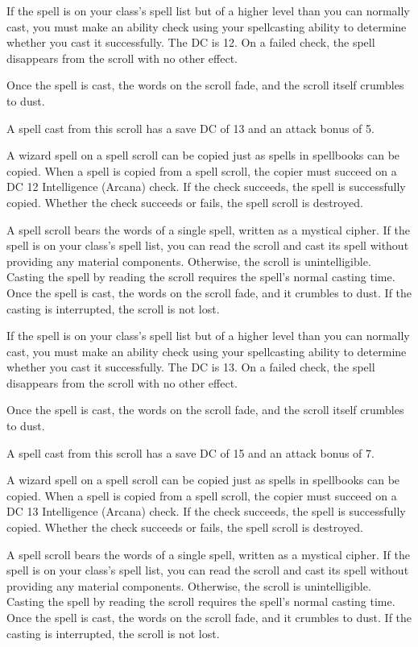 \documentclass[10pt,a4paper,twoside,bg=print,twocolumn,openany,nodeprecatedcode]{dndbook}
\begin{document}
If the spell is on your class's spell list but of a higher level than you can normally cast, you must make an ability check using your spellcasting ability to determine whether you cast it successfully. The DC is 12. On a failed check, the spell disappears from the scroll with no other effect.

Once the spell is cast, the words on the scroll fade, and the scroll itself crumbles to dust.

A spell cast from this scroll has a save DC of 13 and an attack bonus of 5.

A wizard spell on a spell scroll can be copied just as spells in spellbooks can be copied. When a spell is copied from a spell scroll, the copier must succeed on a DC 12 Intelligence (Arcana) check. If the check succeeds, the spell is successfully copied. Whether the check succeeds or fails, the spell scroll is destroyed.

A spell scroll bears the words of a single spell, written as a mystical cipher. If the spell is on your class's spell list, you can read the scroll and cast its spell without providing any material components. Otherwise, the scroll is unintelligible. Casting the spell by reading the scroll requires the spell's normal casting time. Once the spell is cast, the words on the scroll fade, and it crumbles to dust. If the casting is interrupted, the scroll is not lost.

If the spell is on your class's spell list but of a higher level than you can normally cast, you must make an ability check using your spellcasting ability to determine whether you cast it successfully. The DC is 13. On a failed check, the spell disappears from the scroll with no other effect.

Once the spell is cast, the words on the scroll fade, and the scroll itself crumbles to dust.

A spell cast from this scroll has a save DC of 15 and an attack bonus of 7.

A wizard spell on a spell scroll can be copied just as spells in spellbooks can be copied. When a spell is copied from a spell scroll, the copier must succeed on a DC 13 Intelligence (Arcana) check. If the check succeeds, the spell is successfully copied. Whether the check succeeds or fails, the spell scroll is destroyed.

A spell scroll bears the words of a single spell, written as a mystical cipher. If the spell is on your class's spell list, you can read the scroll and cast its spell without providing any material components. Otherwise, the scroll is unintelligible. Casting the spell by reading the scroll requires the spell's normal casting time. Once the spell is cast, the words on the scroll fade, and it crumbles to dust. If the casting is interrupted, the scroll is not lost.
\end{document}

